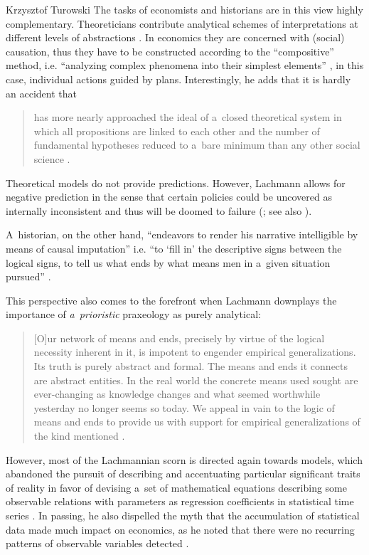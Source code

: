 \begin{artengenv}{Krzysztof Turowski}
The tasks of economists and historians are in this view highly complementary.
Theoreticians contribute analytical schemes of interpretations at different levels of abstractions \parencite[179]{lachmann-science}. In economics they are concerned with (social) causation, thus they have to be constructed according to the ``compositive'' method, i.e. ``analyzing complex phenomena into their simplest elements'' \parencite[172]{lachmann-science}, in this case, individual actions guided by plans.
Interestingly, he adds that it is hardly an accident that
\begin{quote}
has more nearly approached the ideal of a~closed theoretical system in which all propositions are linked to each other and the number of fundamental hypotheses reduced to a~bare minimum than any other social science \parencite[179]{lachmann-science}.
\end{quote}
Theoretical models do not provide predictions. However, Lachmann allows for negative prediction in the sense that certain policies could be uncovered as internally inconsistent and thus will be doomed to failure (\cite[89]{lachmann-shackle-time}; see also \cite[7--8]{lachmann-shackle-place}).

A~historian, on the other hand, ``endeavors to render his narrative intelligible by means of causal imputation'' \parencite[178]{lachmann-science} i.e. ``to `fill in' the descriptive signs between the logical signs, to tell us what ends by what means men in a~given situation pursued'' \parencite[175]{lachmann-science}.

This perspective also comes to the forefront when Lachmann downplays the importance of \emph{a~prioristic} praxeology as purely analytical:
\begin{quote}
[O]ur network of means and ends, precisely by virtue of the logical necessity inherent in it, is impotent to engender empirical generalizations. Its truth is purely abstract and formal. The means and ends it connects are abstract entities. In the real world the concrete means used sought are ever-changing as knowledge changes and what seemed worthwhile yesterday no longer seems so today. We appeal in vain to the logic of means and ends to provide us with support for empirical generalizations of the kind mentioned \parencite[31]{lachmann1986market}.
\end{quote}

However, most of the Lachmannian scorn is directed again towards models, which abandoned the pursuit of describing and accentuating particular significant traits of reality in favor of devising a~set of mathematical equations describing some observable relations with parameters as regression coefficients in statistical time series \parencite[35]{lachmann1986market}.
In passing, he also dispelled the myth that the accumulation of statistical data made much impact on economics, as he noted that there were no recurring patterns of observable variables detected \parencite[177]{lachmann-science}.


\end{artengenv}
